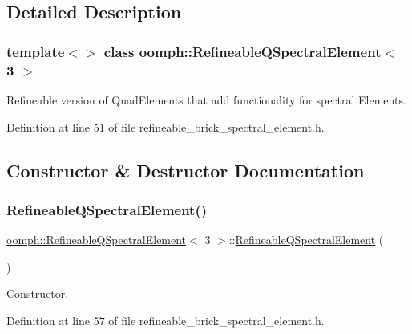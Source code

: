 \subsection{Detailed Description}
\subsubsection*{template$<$$>$\newline
class oomph\+::\+Refineable\+Q\+Spectral\+Element$<$ 3 $>$}

Refineable version of Quad\+Elements that add functionality for spectral Elements. 

Definition at line 51 of file refineable\+\_\+brick\+\_\+spectral\+\_\+element.\+h.



\subsection{Constructor \& Destructor Documentation}
\mbox{\label{classoomph_1_1RefineableQSpectralElement_3_013_01_4_ab95cf02c87a2d5006c7f44f2f98408b8}} 
\subsubsection{\texorpdfstring{Refineable\+Q\+Spectral\+Element()}{RefineableQSpectralElement()}\hspace{0.1cm}{\footnotesize\ttfamily [1/2]}}
{\footnotesize\ttfamily \hyperlink{classoomph_1_1RefineableQSpectralElement}{oomph\+::\+Refineable\+Q\+Spectral\+Element}$<$ 3 $>$\+::\hyperlink{classoomph_1_1RefineableQSpectralElement}{Refineable\+Q\+Spectral\+Element} (\begin{DoxyParamCaption}{ }\end{DoxyParamCaption})\hspace{0.3cm}{\ttfamily [inline]}}



Constructor. 



Definition at line 57 of file refineable\+\_\+brick\+\_\+spectral\+\_\+element.\+h.



